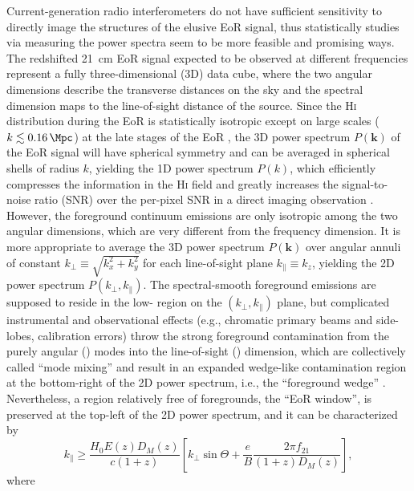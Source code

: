\documentclass[modern]{aastex62}
\newcommand{\Hi}{H\textsc{i}}
\newcommand{\klos}{\text{$k_{\parallel}$}}
\newcommand{\kperp}{\text{$k_{\bot}$}}
\begin{document}
Current-generation radio interferometers do not have sufficient sensitivity
to directly image the structures of the elusive EoR signal,
thus statistically studies via measuring the power spectra seem to be
more feasible and promising ways.
The redshifted 21~cm EoR signal expected to be observed at different
frequencies represent a fully three-dimensional (3D) data cube, where the
two angular dimensions describe the transverse distances on the sky and
the spectral dimension maps to the line-of-sight distance of the source.
{\color{cyan}%
Since the \Hi{} distribution during the EoR is statistically isotropic
except on large scales ($k \lesssim \SI{0.16}{\per\Mpc}$) at the late
stages of the EoR \citep[e.g.,][]{datta2012}},
the 3D power spectrum $P(\mathbf{k})$ of the EoR signal
will have spherical symmetry and can be averaged in spherical shells of
radius $k$, yielding the 1D power spectrum $P(k)$, which efficiently
compresses the information in the \Hi{} field and greatly increases the
signal-to-noise ratio (SNR) over the per-pixel SNR in a direct imaging
observation \citep{morales2004,morales2006,datta2010}.
However, the foreground continuum emissions are only isotropic among the
two angular dimensions, which are very different from the frequency
dimension.
It is more appropriate to average the 3D power spectrum $P(\mathbf{k})$
over angular annuli of constant $\kperp \equiv \sqrt{k_x^2 + k_y^2}$
for each line-of-sight plane $\klos \equiv k_z$, yielding the 2D power
spectrum $P(\kperp, \klos)$.
The spectral-smooth foreground emissions are supposed to reside in the
low-\klos{} region on the $(\kperp, \klos)$ plane,
but complicated instrumental and observational effects (e.g., chromatic
primary beams and side-lobes, calibration errors) throw the strong
foreground contamination from the purely angular (\kperp) modes into the
line-of-sight (\klos) dimension, which are collectively called
\enquote{mode mixing} and result in an expanded wedge-like contamination
region at the bottom-right of the 2D power spectrum, i.e., the
\enquote{foreground wedge} \citep[e.g.,][]{datta2010,morales2012,liu2014}.
Nevertheless, a region relatively free of foregrounds,
the \enquote{EoR window}, is preserved at the top-left of the 2D power
spectrum, and it can be characterized by \citep{thyagarajan2013}
\begin{equation}
  \label{eq:eor-window}
  \klos \geq \frac{H_0 E(z) D_{\!M}(z)}{c (1+z)} \left[
    \kperp \sin\Theta +
    \frac{e}{B} \frac{2\pi f_{21}}{(1+z) D_{\!M}(z)} \right],
\end{equation}
where
\end{document}
